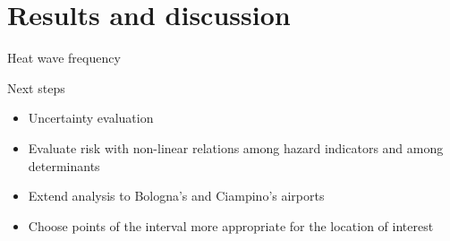 \documentclass[aspectratio=169]{beamer}
\begin{document}

\section{Results and discussion}
\begin{frame}{Heat wave frequency}
\end{frame}


\begin{frame}{Next steps}
  \begin{itemize}
    \item Uncertainty evaluation
    \item Evaluate risk with non-linear relations among hazard indicators and among determinants
    \item Extend analysis to Bologna's and Ciampino's airports
    \item Choose points of the interval more appropriate for the location of interest
  \end{itemize}
\end{frame}
\end{document}
